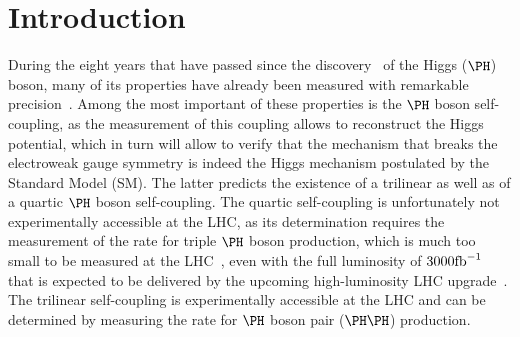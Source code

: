\section{Introduction}
\label{sec:introduction}

During the eight years that have passed since the discovery~\cite{Higgs-Discovery_CMS,Higgs-Discovery_CMS_long,Higgs-Discovery_ATLAS} of the Higgs ($\PHiggs$) boson,
many of its properties have already been measured with remarkable precision~\cite{HIG-14-042,HIG-15-002,ATLAS_SpinCP,HIG-14-018,HIG-16-041}.
Among the most important of these properties is the $\PHiggs$ boson self-coupling, as the measurement of this coupling allows to reconstruct the Higgs potential,
which in turn will allow to verify that the mechanism that breaks the electroweak gauge symmetry is indeed the Higgs mechanism postulated by the Standard Model (SM).
The latter predicts the existence of a trilinear as well as of a quartic $\PHiggs$ boson self-coupling.
The quartic self-coupling is unfortunately not experimentally accessible at the LHC,
as its determination requires the measurement of the rate for triple $\PHiggs$ boson production, 
which is much too small to be measured at the LHC~\cite{de_Florian_2020}, 
even with the full luminosity of $3000\text{fb}^{-1}$ that is expected to be delivered by the upcoming high-luminosity LHC upgrade~\cite{HL-LHC-TDR}.
The trilinear self-coupling is experimentally accessible at the LHC and can be determined by measuring the rate for $\PHiggs$ boson pair ($\HH$) production.

